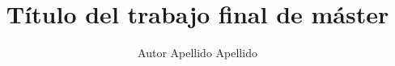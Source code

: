 \documentclass[a4paper,12pt,oneside,hidelinks,openany]{report}
\begin{document}
\title{Título del trabajo final de máster}
\author{Autor Apellido Apellido}

\pagebreak
\cleardoublepage
\baselineskip 19pt

\renewcommand{\labelitemi}{$-$}
\renewcommand{\tablename}{Tabla}

\renewcommand{\appendixname}{Anexos}
\renewcommand{\appendixtocname}{Anexos}
\renewcommand{\appendixpagename}{Anexos}





\cleardoublepage



\newpage


\newpage
\cleardoublepage

\newpage

\cleardoublepage
\renewcommand{\contentsname}{Índice}
\tableofcontents

\cleardoublepage
\printnoidxglossary[title=Glosario,toctitle=Glosario,sort=letter]











\nocite{*} 

\newpage
\renewcommand\listfigurename{Lista de Figuras}
\listoffigures

\newpage
\renewcommand\listtablename{Lista de Tablas}
\listoftables


\newpage
\appendix
\clearpage
\addappheadtotoc
\appendixpage
% 



\end{document}
